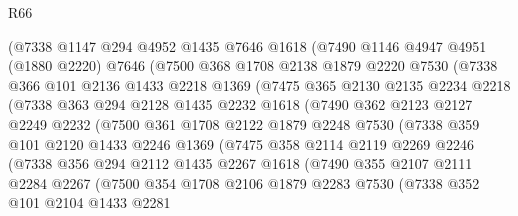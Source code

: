 \begin{lexlean}{R66}
\begin{coremodule}
        (@7338
          @1147
          @294
          @4952
          @1435
          @7646
          @1618
          (@7490
            @1146
            @4947
            @4951
            (@1880 @2220)
            @7646
            (@7500
              @368
              @1708
              @2138
              @1879
              @2220
              @7530
              (@7338
                @366
                @101
                @2136
                @1433
                @2218
                @1369
                (@7475
                  @365
                  @2130
                  @2135
                  @2234
                  @2218
                  (@7338
                    @363
                    @294
                    @2128
                    @1435
                    @2232
                    @1618
                    (@7490
                      @362
                      @2123
                      @2127
                      @2249
                      @2232
                      (@7500
                        @361
                        @1708
                        @2122
                        @1879
                        @2248
                        @7530
                        (@7338
                          @359
                          @101
                          @2120
                          @1433
                          @2246
                          @1369
                          (@7475
                            @358
                            @2114
                            @2119
                            @2269
                            @2246
                            (@7338
                              @356
                              @294
                              @2112
                              @1435
                              @2267
                              @1618
                              (@7490
                                @355
                                @2107
                                @2111
                                @2284
                                @2267
                                (@7500
                                  @354
                                  @1708
                                  @2106
                                  @1879
                                  @2283
                                  @7530
                                  (@7338
                                    @352
                                    @101
                                    @2104
                                    @1433
                                    @2281

\end{coremodule}
\end{lexlean}
